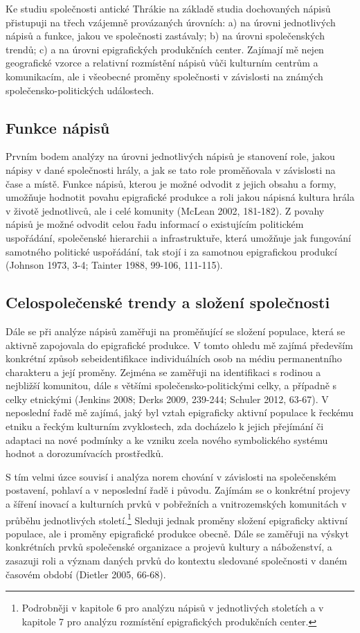 Ke studiu společnosti antické Thrákie na základě studia dochovaných nápisů přistupuji na třech vzájemně provázaných úrovních: a) na úrovni jednotlivých nápisů a funkce, jakou ve společnosti zastávaly; b) na úrovni společenských trendů; c) a na úrovni epigrafických produkčních center. Zajímají mě nejen geografické vzorce a relativní rozmístění nápisů vůči kulturním centrům a komunikacím, ale i všeobecné proměny společnosti v závislosti na známých společensko-politických událostech.

\subsection[funkce-nápisů]{Funkce nápisů}

Prvním bodem analýzy na úrovni jednotlivých nápisů je stanovení role, jakou nápisy v dané společnosti hrály, a jak se tato role proměňovala v závislosti na čase a místě. Funkce nápisů, kterou je možné odvodit z jejich obsahu a formy, umožňuje hodnotit povahu epigrafické produkce a roli jakou nápisná kultura hrála v životě jednotlivců, ale i celé komunity (McLean 2002, 181-182). Z povahy nápisů je možné odvodit celou řadu informací o existujícím politickém uspořádání, společenské hierarchii a infrastruktuře, která umožňuje jak fungování samotného politické uspořádání, tak stojí i za samotnou epigrafickou produkcí (Johnson 1973, 3-4; Tainter 1988, 99-106, 111-115).

\subsection[celospolečenské-trendy-a-složení-společnosti]{Celospolečenské trendy a složení společnosti}

Dále se při analýze nápisů zaměřuji na proměňující se složení populace, která se aktivně zapojovala do epigrafické produkce. V tomto ohledu mě zajímá především konkrétní způsob sebeidentifikace individuálních osob na médiu permanentního charakteru a její proměny. Zejména se zaměřuji na identifikaci s rodinou a nejbližší komunitou, dále s většími společensko-politickými celky, a případně s celky etnickými (Jenkins 2008; Derks 2009, 239-244; Schuler 2012, 63-67). V neposlední řadě mě zajímá, jaký byl vztah epigraficky aktivní populace k řeckému etniku a řeckým kulturním zvyklostech, zda docházelo k jejich přejímání či adaptaci na nové podmínky a ke vzniku zcela nového symbolického systému hodnot a dorozumívacích prostředků.

S tím velmi úzce souvisí i analýza norem chování v závislosti na společenském postavení, pohlaví a v neposlední řadě i původu. Zajímám se o konkrétní projevy a šíření inovací a kulturních prvků v pobřežních a vnitrozemských komunitách v průběhu jednotlivých století.\footnote{Podrobněji v kapitole 6 pro analýzu nápisů v jednotlivých stoletích a v kapitole 7 pro analýzu rozmístění epigrafických produkčních center.} Sleduji jednak proměny složení epigraficky aktivní populace, ale i proměny epigrafické produkce obecně. Dále se zaměřuji na výskyt konkrétních prvků společenské organizace a projevů kultury a náboženství, a zasazuji roli a význam daných prvků do kontextu sledované společnosti v daném časovém období (Dietler 2005, 66-68).

